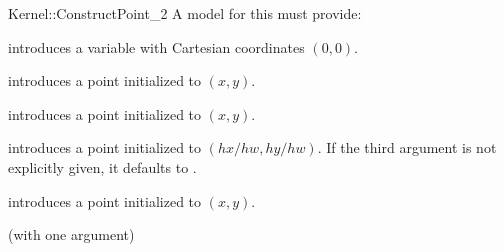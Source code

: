 \begin{ccRefFunctionObjectConcept}{Kernel::ConstructPoint_2}
A model for this must provide:


            {introduces a variable  with Cartesian coordinates
              $(0,0)$.}

\ccHidden{}
            {introduces a point  initialized to $(x,y)$.}

\ccHidden{}
            {introduces a point  initialized to $(x,y)$.}

\ccHidden{}
            {introduces a point  initialized to $(hx/hw,hy/hw)$.
             If the third argument is not explicitly given, it defaults
             to .
              }

\ccHidden{}
            {introduces a point  initialized to $(x,y)$.}

\ccRefines
{} (with one argument)

\ccSeeAlso
{} \\

\end{ccRefFunctionObjectConcept}
